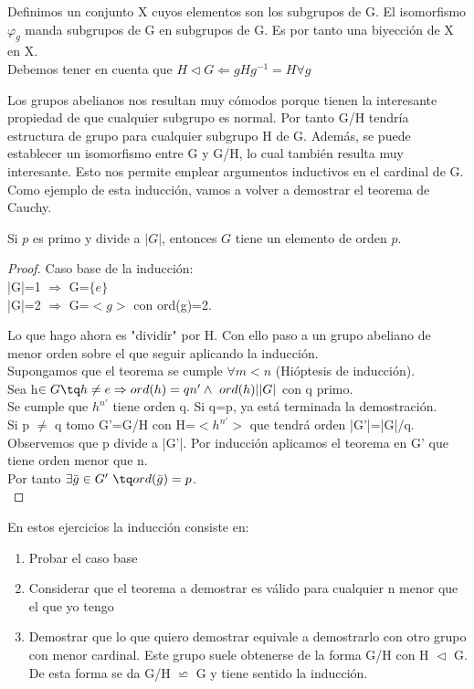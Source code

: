\documentclass[nochap]{apuntes}
\begin{document}
Definimos un conjunto X cuyos elementos son los subgrupos de G. El isomorfismo $\varphi_{g}$  manda subgrupos de G en subgrupos de G. 
Es por tanto una biyección de X en X.\\
Debemos tener en cuenta que $H \vartriangleleft G \Leftarrow gHg^{-1}=H \forall g$

Los grupos abelianos nos resultan muy cómodos porque tienen la interesante propiedad de que cualquier subgrupo es normal. Por tanto
G/H tendría estructura de grupo para cualquier subgrupo H de G. Además, se puede establecer un isomorfismo entre G y G/H, lo cual también 
resulta muy interesante. Esto nos permite emplear argumentos inductivos en el cardinal de G.\\
Como ejemplo de esta inducción, vamos a volver a demostrar el teorema de Cauchy.
\begin{theorem}\label{thmCauchy}
 Si $p$ es primo y divide a $|G|$, entonces $G$ tiene un elemento de orden $p$.
\end{theorem}
\begin{proof}
 Caso base de la inducción:\\
 |G|=1 $\Rightarrow$ G=$\{e\}$ \\
 |G|=2 $\Rightarrow$  G=$<g>$  con ord(g)=2.
 
 Lo que hago ahora es "dividir" por H. Con ello paso a un grupo abeliano de menor orden sobre el que seguir aplicando la inducción.\\
 Supongamos que el teorema se cumple $\forall m < n$  (Hióptesis de inducción).\\
 Sea h$\in G \tq h\neq e\Rightarrow ord(h)=qn' \wedge \ ord(h)| |G|$  con q primo.\\
 Se cumple que $h^{n'}$  tiene orden q. Si q=p, ya está terminada la demostración.\\
 Si p $\neq$ q tomo G'=G/H con H=$<h^{n'}>$  que tendrá orden |G'|=|G|/q.\\
 Observemos que p divide a |G'|. Por inducción aplicamos el teorema en G' que tiene orden menor que n.\\
 Por tanto $\exists \bar{g}\in G' \ \tq ord(\bar{g})=p$.\\
\end{proof}

\begin{defn}[Inducción]
 En estos ejercicios la inducción consiste en:
 \begin{enumerate}
  \item Probar el caso base
  \item Considerar que el teorema a demostrar es válido para cualquier n menor que el que yo tengo
  \item Demostrar que lo que quiero demostrar equivale a demostrarlo con otro grupo con menor cardinal. Este grupo suele obtenerse
  de la forma G/H con H $\vartriangleleft$ G. De esta forma se da G/H $\backsimeq$ G y tiene sentido la inducción.
 \end{enumerate}
\end{defn}
\end{document}
